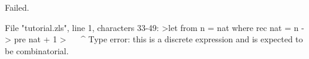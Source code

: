 \chklistingfalse
{}
\begin{ChkListingMsg}
Failed.
\end{ChkListingMsg}
\begin{ChkListingErr}
File "tutorial.zls", line 1, characters 33-49:
>let from n = nat where rec nat = n -> pre nat + 1
>                                 ^^^^^^^^^^^^^^^^
Type error: this is a discrete expression and is expected to be combinatorial.
\end{ChkListingErr}
